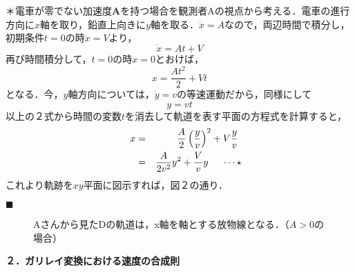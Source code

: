\documentclass[b5j,dvipdfmx,uplatex]{jsarticle}
\begin{document}
\noindent
＊電車が零でない加速度$\mathbf{A}$を持つ場合を観測者Aの視点から考える．電車の進行方向に$x$軸を取り，鉛直上向きに$y$軸を取る．$\ddot{x}=A$なので，両辺時間で積分し，初期条件$t=0$の時$\dot{x}=V$より，$$\dot{x}=At+V$$再び時間積分して，$t=0$の時$x=0$とおけば，$$x=\frac{At^2}{2}+Vt$$となる．今，$y$軸方向については，$\dot{y}=v$の等速運動だから，同様にして$$y=vt$$以上の２式から時間の変数$t$を消去して軌道を表す平面の方程式を計算すると，
\begin{eqnarray*}
    x&=&\frac{A}{2}\left(\frac{y}{v}\right)^2+ V\frac{y}{v} \\
    &=&\frac{A}{2v^2}y^2+\frac{V}{v}y\hspace{5mm}\dots\star
\end{eqnarray*}
これより軌跡を$xy$平面に図示すれば，図２の通り．
\begin{flushright}
    $\blacksquare$
\end{flushright}

\begin{figure} \caption{Aさんから見たDの軌道は，x軸を軸とする放物線となる．（$A>0$の場合）}
\begin{center}
\end{center}
\end{figure}

\vspace{30cm}

\medskip
{
\begin{tcolorbox}[enhanced,frame code={
\foreach \n in {north east,north west,south east,south west}
{\path [fill=black!75!black] (interior.\n) circle (2mm); }; }]
\Large \bf ２．ガリレイ変換における速度の合成則
\end{tcolorbox}}
\medskip
\end{document}
